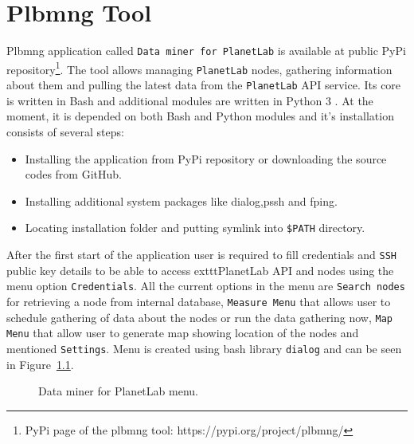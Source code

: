 \chapter{Plbmng Tool}
\label{chapter:plbmng}
Plbmng application called \texttt{Data miner for PlanetLab} is available at public PyPi repository\footnote{PyPi page of the plbmng tool: https://pypi.org/project/plbmng/}. The tool allows managing \texttt{PlanetLab} nodes, gathering information about them and pulling the latest data from the \texttt{PlanetLab} API service. Its core is written in Bash and additional modules are written in Python 3 \cite{suba1}. At the moment, it is depended on both Bash and Python modules and it's installation consists of several steps:
\begin{itemize}
	\item Installing the application from PyPi repository or downloading the source codes from GitHub.
	\item Installing additional system packages like dialog,pssh and fping.
	\item Locating installation folder and putting symlink into \texttt{\$PATH} directory.
\end{itemize}
After the first start of the application user is required to fill credentials and \texttt{SSH} public key details to be able to access 	exttt{PlanetLab} API and nodes using the menu option \texttt{Credentials}. All the current options in the menu are \texttt{Search nodes} for retrieving a node from internal database, \texttt{Measure Menu} that allows user to schedule gathering of data about the nodes or run the data gathering now, \texttt{Map Menu} that allow user to generate map showing location of the nodes and mentioned \texttt{Settings}. Menu is created using bash library \texttt{dialog} and can be seen in Figure~\ref{fig:planetlaboldmenu}. 

\begin{figure}[H]
	\centering
	\caption{Data miner for PlanetLab menu.}
	\label{fig:planetlaboldmenu}
\end{figure}

